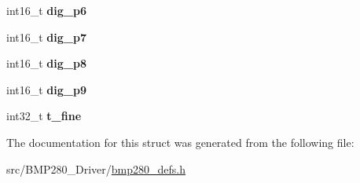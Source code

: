 \begin{DoxyCompactItemize}
int16\+\_\+t {\bfseries dig\+\_\+p6}
\item 
\mbox{\label{structbmp280__calib__param_abbe09c23a6dda945d69bd6c04b19a1fa}} 
int16\+\_\+t {\bfseries dig\+\_\+p7}
\item 
\mbox{\label{structbmp280__calib__param_ab0b8da3335b2117efbc3db1debf47b86}} 
int16\+\_\+t {\bfseries dig\+\_\+p8}
\item 
\mbox{\label{structbmp280__calib__param_a2eedb0f856bef96e6424e8e957c81ee1}} 
int16\+\_\+t {\bfseries dig\+\_\+p9}
\item 
\mbox{\label{structbmp280__calib__param_a122080a46a8777a2edda114f341b6b35}} 
int32\+\_\+t {\bfseries t\+\_\+fine}
\end{DoxyCompactItemize}


The documentation for this struct was generated from the following file\+:\begin{DoxyCompactItemize}
\item 
src/\+B\+M\+P280\+\_\+\+Driver/\mbox{\hyperlink{bmp280__defs_8h}{bmp280\+\_\+defs.\+h}}\end{DoxyCompactItemize}
